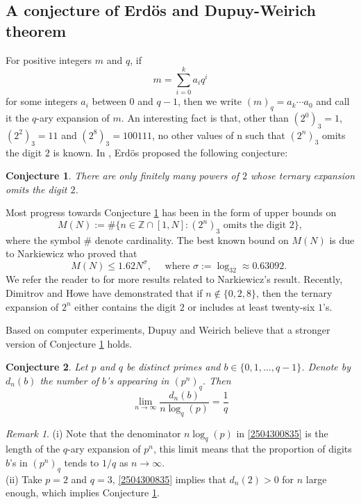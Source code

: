 \documentclass[12pt]{amsart}
\theoremstyle{plain}
\newtheorem{conj}{Conjecture}[section]
\theoremstyle{definition}
\theoremstyle{remark}
\newtheorem{rem}{Remark}[section]
\numberwithin{equation}{section}
\newcommand{\Z}{\mathbb Z}
\begin{document}
	\subsection{A conjecture of Erd\"os and Dupuy-Weirich theorem}\label{2512091258}
	For positive integers $m$ and $q$, if $$m = \sum_{i=0}^{k} a_{i} q^{i}$$ for some integers $a_{i}$ between $0$ and $q-1$, then we write $(m)_q = a_{k} \cdots a_{0}$ and call it the $q$-ary expansion of $m$. An interesting fact is that, other than $(2^0)_3=1$, $(2^2)_{3}=11$ and $(2^8)_3=100111$, no other values of n such that $(2^n)_3$ omits the digit $2$ is known. In \cite{Erdos1979}, Erd\"os  proposed the following conjecture:
	\begin{conj}\label{2601051536}
		There are only finitely many powers of $2$ whose 
		ternary expansion omits the digit $2$.
	\end{conj}
	Most progress towards Conjecture \ref{2601051536} has been in the form of upper bounds on
	\[M(N):=\#\{n\in\Z\cap[1,N]\colon (2^n)_3\text{ omits the digit $2$}\},\]
	where the symbol $\#$ denote cardinality. The best known bound on $M(N)$ is due to Narkiewicz \cite{Narkiewicz1980} who proved that
	\begin{equation}\label{2402121459}
		M(N)\le1.62N^{\sigma}, \quad\text{	where $\sigma:=\log_32\approx0.63092$. }
	\end{equation}
	We refer the reader to \cite{Dupuy2016a,Holdum2015,Kennedy2000,Lagarias2009,LZ2025} for more results related to Narkiewicz's result. Recently, Dimitrov and Howe \cite[Theorem 1.2]{DH2025} have demonstrated that if $n\notin\{0,2,8\}$, then the ternary expansion of $2^n$ either contains the digit $2$ or includes at least twenty-six $1$'s. 
	
	Based on computer experiments, Dupuy and Weirich \cite{Dupuy2016a} believe that a stronger version of Conjecture \ref{2601051536} holds.
	\begin{conj}\label{2504301154}
		Let $p$ and $q$ be distinct primes and $b\in\{0,1,\dots,q-1\}$. Denote by $d_n(b)$ the number of $b$'s appearing in $(p^n)_q$. Then
		\begin{equation}\label{2504300835}
			\lim_{n\to\infty}\frac{d_n(b)}{n\log_q(p)}=\frac{1}{q}
		\end{equation}
	\end{conj}
	\begin{rem}
		(i)  Note that the denominator $n\log_q(p)$ in \eqref{2504300835} is the length of the $q$-ary expansion of $p^n$, this limit means that the proportion of digits $b$'s in $(p^n)_q$ tends to $1/q$ as $n\to\infty$.\\
		(ii) Take $p=2$ and $q=3$, \eqref{2504300835} implies that $d_n(2)>0$ for $n$ large enough, which implies Conjecture \ref{2601051536}.
	\end{rem}
	
\end{document}
